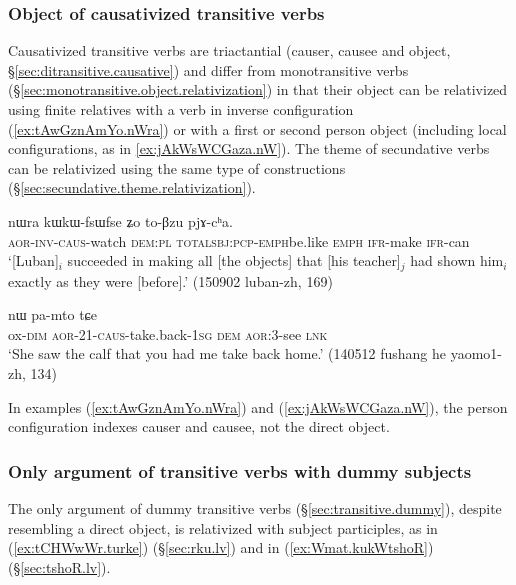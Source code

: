 \subsubsection{Object of causativized transitive verbs} \label{sec:object.causative.relativization}
Causativized transitive verbs are triactantial (causer, causee and object, §\ref{sec:ditransitive.causative}) and differ from monotransitive verbs (§\ref{sec:monotransitive.object.relativization}) in that their object can be relativized using finite relatives with a verb in inverse configuration (\ref{ex:tAwGznAmYo.nWra}) or with a first or second person object (including local configurations, as in \ref{ex:jAkWsWCGaza.nW}). The theme of secundative verbs can be relativized using the same type of constructions (§\ref{sec:secundative.theme.relativization}).

\begin{exe}
\ex \label{ex:tAwGznAmYo.nWra}
\gll [tɤ́-wɣ-z-nɤmɲo] nɯra kɯ\redp{}kɯ-fsɯ\redp{}fse ʑo to-βzu pjɤ-cʰa.   \\
\textsc{aor}-\textsc{inv}-\textsc{caus}-watch \textsc{dem}:\textsc{pl} \textsc{total}\redp{}\textsc{sbj}:\textsc{pcp}-\textsc{emph}\redp{}be.like \textsc{emph} \textsc{ifr}-make \textsc{ifr}-can \\
\glt `[Luban]$_i$ succeeded in making all [the objects] that [his teacher]$_j$ had shown him$_i$ exactly as they were [before].' (150902 luban-zh, 169)
\end{exe} 
 
\begin{exe}
\ex \label{ex:jAkWsWCGaza.nW}
 nɯ pa-mto tɕe \\
ox-\textsc{dim} \textsc{aor}-2\fl{}1-\textsc{caus}-take.back-\textsc{1sg} \textsc{dem} \textsc{aor}:3\flobv{}-see \textsc{lnk} \\
\glt `She saw the calf that you had me take back home.' (140512 fushang he yaomo1-zh, 134)
\end{exe} 

In examples (\ref{ex:tAwGznAmYo.nWra}) and (\ref{ex:jAkWsWCGaza.nW}), the person configuration indexes causer and causee, not the direct object. 

\subsubsection{Only argument of transitive verbs with dummy subjects}  \label{sec:dummy.subj.object.relativization}
The only argument of dummy transitive verbs (§\ref{sec:transitive.dummy}), despite resembling a direct object, is relativized with subject participles, as  in (\ref{ex:tCHWwWr.turke}) (§\ref{sec:rku.lv}) and  in (\ref{ex:Wmat.kukWtshoR}) (§\ref{sec:tshoR.lv}). 

